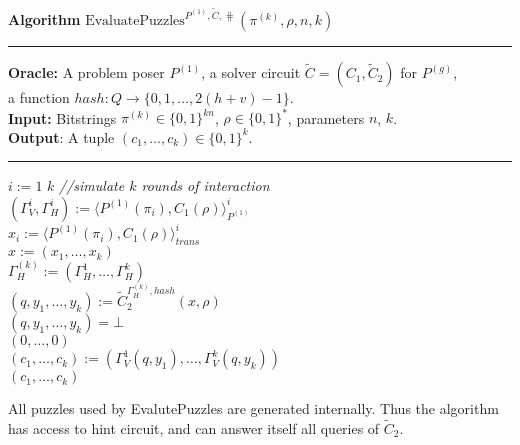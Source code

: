 \begin{codeblock}
  \textbf{Algorithm} $\text{EvaluatePuzzles}^{P^{(1)}, \widetilde{C}, \hash}(\pi^{(k)}, \rho, n, k)$
  \medskip \hrule \medskip
  \textbf{Oracle:}  A problem poser $P^{(1)}$, a solver circuit $\widetilde{C} = (C_1, \widetilde{C}_2)$ for $P^{(g)}$,\\
  \IndII a function $hash : Q \rightarrow \{0,1,\dots, 2(h+v)-1\}$.\\
  \textbf{Input:} Bitstrings $\pi^{(k)} \in \{0,1\}^{kn}$, $\rho \in \{0,1\}^{*}$, parameters $n$, $k$.\\
  \textbf{Output}: A tuple $(c_1, \dots, c_k) \in \{0,1\}^{k}$.
  \medskip\hrule\medskip
  \For $i:=1$ \To $k$ \Do \IndII \textit{//simulate $k$ rounds of interaction} \\
  \IndI $(\Gamma_V^{i}, \Gamma_H^{i}) := \langle P^{(1)}(\pi_i), C_1(\rho) \rangle_{P^{(1)}}^i$\\
  \IndI $x_i := \langle P^{(1)}(\pi_i), C_1(\rho) \rangle^i_{\mathit{trans}}$ \\
  $x := (x_1, \dots, x_k)$ \\
  $\Gamma_H^{(k)} := (\Gamma_H^1, \dotsc, \Gamma_H^k)$ \\
  $(q, y_1, \dots, y_k) := \widetilde{C}_2^{\Gamma_H^{(k)}, hash} (x, \rho)$ \\
  \If $(q, y_1, \dots, y_k) = \bot$ \Then \\
  \IndI \Return $(0, \dotsc, 0)$ \\
  $(c_1, \dotsc, c_k) := (\Gamma_V^{1}(q, y_1), \dotsc, \Gamma_V^{k}(q, y_k))$\\
  \Return $(c_1, \dotsc, c_k)$
\end{codeblock}
%
All puzzles used by EvalutePuzzles are generated internally. Thus the algorithm
has access to hint circuit, and can answer itself all queries of $\widetilde{C}_2$.

